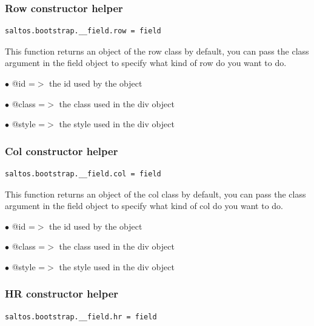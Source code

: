 \documentclass[a4paper]{article}
\begin{document}
\hypertarget{toc47}{}
\subsubsection{Row constructor helper}

\begin{lstlisting}
saltos.bootstrap.__field.row = field
\end{lstlisting}

This function returns an object of the row class by default, you can pass the class argument
in the field object to specify what kind of row do you want to do.

\begin{compactitem}
\item[\color{myblue}$\bullet$] @id    =$>$ the id used by the object
\item[\color{myblue}$\bullet$] @class =$>$ the class used in the div object
\item[\color{myblue}$\bullet$] @style =$>$ the style used in the div object
\end{compactitem}

\hypertarget{toc48}{}
\subsubsection{Col constructor helper}

\begin{lstlisting}
saltos.bootstrap.__field.col = field
\end{lstlisting}

This function returns an object of the col class by default, you can pass the class argument
in the field object to specify what kind of col do you want to do.

\begin{compactitem}
\item[\color{myblue}$\bullet$] @id    =$>$ the id used by the object
\item[\color{myblue}$\bullet$] @class =$>$ the class used in the div object
\item[\color{myblue}$\bullet$] @style =$>$ the style used in the div object
\end{compactitem}

\hypertarget{toc49}{}
\subsubsection{HR constructor helper}

\begin{lstlisting}
saltos.bootstrap.__field.hr = field
\end{lstlisting}
\end{document}
